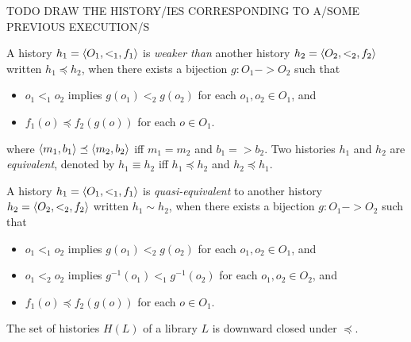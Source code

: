 \begin{example}
  \label{ex:histories}

  TODO DRAW THE HISTORY/IES CORRESPONDING TO A/SOME PREVIOUS EXECUTION/S
  
\end{example}


A history $h_1 = \left\langle {O_1,<_1,f_1} \right\rangle$ is \emph{weaker than} another history $h_2
= \left\langle {O_2,<_2,f_2} \right\rangle$ written $h_1 \preceq h_2$, when there exists a bijection
$g : O_1 -> O_2$ such that
\begin{itemize}
  
  \item $o_1 <_1 o_2$ implies $g(o_1) <_2 g(o_2)$ for each $o_1, o_2 \in O_1$, and
  
  \item $f_1(o) \preceq f_2(g(o))$ for each $o \in O_1$.

\end{itemize}
where $\left\langle {m_1,b_1} \right\rangle \preceq \left\langle {m_2,b_2} \right\rangle$ iff $m_1 = m_2$ and $b_1 => b_2$.
Two histories $h_1$ and $h_2$ are \emph{equivalent}, denoted by $h_1 \equiv h_2$ iff
$h_1 \preceq h_2$ and $h_2 \preceq h_1$.

A history $h_1 = \left\langle {O_1,<_1,f_1} \right\rangle$ is \emph{quasi-equivalent} to another history $h_2
= \left\langle {O_2,<_2,f_2} \right\rangle$ written $h_1 \sim h_2$, when there exists a bijection
$g : O_1 -> O_2$ such that
\begin{itemize}
  
  \item $o_1 <_1 o_2$ implies $g(o_1) <_2 g(o_2)$ for each $o_1, o_2 \in O_1$, and

  \item $o_1 <_2 o_2$ implies $g^{-1}(o_1) <_1 g^{-1}(o_2)$ for each $o_1, o_2 \in O_2$, and
  
  \item $f_1(o) \preceq f_2(g(o))$ for each $o \in O_1$.

\end{itemize}

\begin{lemma}\label{lemma:lib_closure}
  
  The set of histories $H(L)$ of a library $L$ is downward closed under $\preceq$.

\end{lemma}

